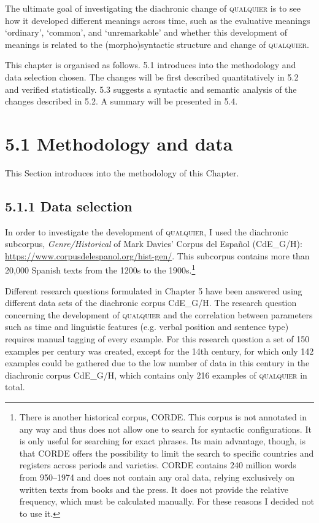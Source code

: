   The ultimate goal of investigating the diachronic change of \textsc{qualquier} is to see how it developed different meanings across time, such as the evaluative meanings ‘ordinary’, ‘common’, and ‘unremarkable’ and whether this development of meanings is related to the (morpho)syntactic structure and change of \textsc{qualquier.} 

  This chapter is organised as follows. 5.1 introduces into the methodology and data selection chosen. The changes will be first described quantitatively in 5.2 and verified statistically. 5.3 suggests a syntactic and semantic analysis of the changes described in 5.2. A summary will be presented in 5.4.

\section{\textbf{5.1} \textbf{Methodology} \textbf{and} \textbf{data}}

 This Section introduces into the methodology of this Chapter. 

\subsection{\textbf{5.1.1} \textbf{Data} \textbf{selection}}

In order to investigate the development of \textsc{qualquier}, I used the diachronic subcorpus, \textit{Genre/Historical} of Mark Davies’ Corpus del Español (CdE\_G/H): \url{https://www.corpusdelespanol.org/hist-gen/}. This subcorpus contains more than 20,000 Spanish texts from the 1200s to the 1900s.\footnote{{There is another historical corpus, CORDE. This corpus is not annotated in any way and thus does not allow one to search for syntactic configurations. It is only useful for searching for exact phrases. Its main advantage, though, is that CORDE offers the possibility to limit the search to specific countries and registers across periods and varieties. CORDE contains 240 million words from 950–1974 and does not contain any oral data, relying exclusively on written texts from books and the press. It does not provide the relative frequency, which must be calculated manually. For these reasons I decided not to use it.}}

  Different research questions formulated in Chapter 5 have been answered using different data sets of the diachronic corpus CdE\_G/H. The research question concerning the development of \textsc{qualquier} and the correlation between parameters such as time and linguistic features (e.g. verbal position and sentence type) requires manual tagging of every example. For this research question a set of 150 examples per century was created, except for the 14th century, for which only 142 examples could be gathered due to the low number of data in this century in the diachronic corpus CdE\_G/H, which contains only 216 examples of \textsc{qualquier} in total. 

